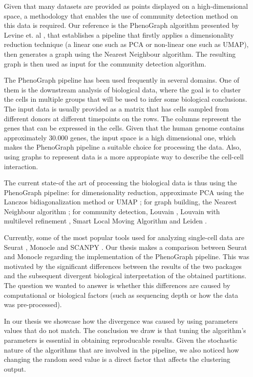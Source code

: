 \documentclass[12pt]{report}
\begin{document}
    Given that many datasets are provided as points displayed on a high-dimensional space, a methodology that enables the use of community detection method on this data is required. Our reference is the PhenoGraph algorithm presented by Levine et. al \cite{Levine2015}, that establishes a pipeline that firstly applies a dimensionality reduction technique (a linear one such as PCA or non-linear one such as UMAP), then generates a graph using the Nearest Neighbour algorithm. The resulting graph is then used as input for the community detection algorithm.

    The PhenoGraph pipeline has been used frequently in several domains. One of them is the downstream analysis of biological data, where the goal is to cluster the cells in multiple groups that will be used to infer some biological conclusions. The input data is usually provided as a matrix that has cells sampled from different donors at different timepoints on the rows. The columns represent the genes that can be expressed in the cells. Given that the human genome contains approximately 30.000 genes, the input space is a high dimensional one, which makes the PhenoGraph pipeline a suitable choice for processing the data. Also, using graphs to represent data is a more appropiate way to describe the cell-cell interaction.

    The current state-of the art of processing the biological data is thus using the PhenoGraph pipeline: for dimensionality reduction, approximate PCA using the Lanczos bidiagonalization method \cite{Baglama2016IRLBAFP} or UMAP \cite{mcinnes2018uniform}; for graph building, the Nearest Neighbour algorithm \cite{Xu2015}; for community detection, Louvain \cite{Blondel2008b}, Louvain with multilevel refinement \cite{Rotta2011}, Smart Local Moving Algorithm \cite{Waltman2013} and Leiden \cite{Traag2019a}. 

    Currently, some of the most popular tools used for analyzing single-cell data are Seurat \cite{Hao2021}, Monocle \cite{Cao2019} and SCANPY \cite{Wolf2018}. Our thesis makes a comparison between Seurat and Monocle regarding the implementation of the PhenoGraph pipeline. This was motivated by the significant differences between the results of the two packages and the subsequent divergent biological interpretation of the obtained partitions. The question we wanted to answer is whether this differences are caused by computational or biological factors (such as sequencing depth or how the data was pre-processed).

    In our thesis we showcase how the divergence was caused by using parameters values that do not match. The conclusion we draw is that tuning the algorithm's parameters is essential in obtaining reproducable results. Given the stochastic nature of the algorithms that are involved in the pipeline, we also noticed how changing the random seed value is a direct factor that affects the clustering output.
\end{document}
